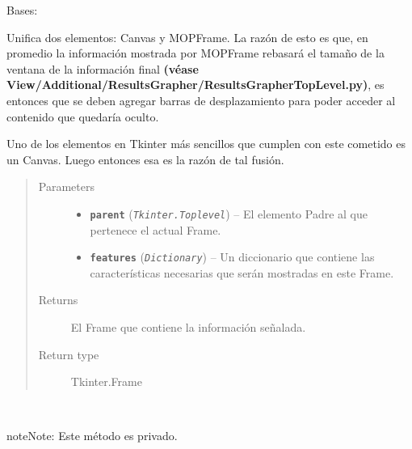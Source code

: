 \documentclass[letterpaper,10pt,english]{sphinxmanual}
\begin{document}
\begin{fulllineitems}
\label{View/Additional/MenuInternalOption/InternalOptionTab/MOPExampleFrame:View.Additional.MenuInternalOption.InternalOptionTab.MOPExampleFrame.MOPExampleFrame}
Bases: 

\begin{DUlineblock}{0em}
\item[] Unifica dos elementos: Canvas y MOPFrame. La razón de esto es que, en promedio la
información mostrada por MOPFrame rebasará el tamaño de la ventana de la información 
final \textbf{(véase View/Additional/ResultsGrapher/ResultsGrapherTopLevel.py)}, es entonces 
que se deben agregar barras de desplazamiento para poder acceder al contenido que quedaría oculto.
\item[] Uno de los elementos en Tkinter más sencillos que cumplen con este cometido es un
Canvas. Luego entonces esa es la razón de tal fusión.
\end{DUlineblock}
\begin{quote}\begin{description}
\item[{Parameters}] \leavevmode\begin{itemize}
\item {} 
\textbf{\texttt{parent}} (\emph{\texttt{Tkinter.Toplevel}}) -- El elemento Padre al que pertenece el actual
Frame.

\item {} 
\textbf{\texttt{features}} (\emph{\texttt{Dictionary}}) -- Un diccionario que contiene las características necesarias
que serán mostradas en este Frame.

\end{itemize}

\item[{Returns}] \leavevmode
El Frame que contiene la información señalada.

\item[{Return type}] \leavevmode
Tkinter.Frame

\end{description}\end{quote}

\begin{fulllineitems}
\label{View/Additional/MenuInternalOption/InternalOptionTab/MOPExampleFrame:View.Additional.MenuInternalOption.InternalOptionTab.MOPExampleFrame.MOPExampleFrame._MOPExampleFrame__update_scrollbar}~
\begin{notice}{note}{Note:}
Este método es privado.
\end{notice}


\end{fulllineitems}
\end{fulllineitems}
\end{document}
